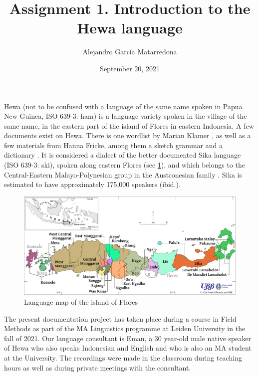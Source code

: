 \documentclass[12pt]{article}
\author{Alejandro García Matarredona}
\title{Assignment 1. Introduction to the Hewa language}
\date{September 20, 2021}
\begin{document}
\maketitle



Hewa (not to be confused with a language of the same name spoken in Papua New Guinea, ISO 639-3: ham) is a language variety spoken in the village of the same name, in the eastern part of the island of Flores in eastern Indonesia. A few documents exist on Hewa. There is one wordlist by Marian Klamer \citep{klamer_2015}, as well as a few materials from Hanna Fricke, among them a sketch grammar \citep{Fricke2014} and a dictionary \citep{fricke_2015}. It is considered a dialect of the better documented Sika language (ISO 639-3: ski), spoken along eastern Flores (see \cref{fig:langmap}), and which belongs to the Central-Eastern Malayo-Polynesian group in the Austronesian family \citep{Lewis1995}. Sika is estimated to have approximately 175,000 speakers (ibid.).


\begin{figure}[h]

\includegraphics[width=0.9\linewidth] {Images/flores_languages__inset_.png}

\caption{Language map of the island of Flores \citep{edwards_ubb_2018}}
\label{fig:langmap}
\end{figure}


The present documentation project has taken place during a course in Field Methods as part of the MA Linguistics programme at Leiden University in the fall of 2021. Our language consultant is Eman, a 30 year-old male native speaker of Hewa who also speaks Indonesian and English and who is also an MA student at the University. The recordings were made in the classroom during teaching hours as well as during private meetings with the consultant.



\printbibliography
\end{document}
